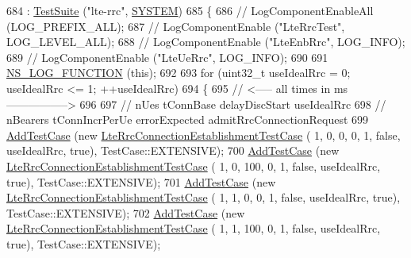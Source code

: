 \begin{DoxyCode}
684   : \hyperlink{classns3_1_1TestSuite_a904b0c40583b744d30908aeb94636d1a}{TestSuite} (\textcolor{stringliteral}{"lte-rrc"}, \hyperlink{classns3_1_1TestSuite_a1ebfcab34ec8161e085e8e3a1855eae0a90c5529a26ab3a5ffcc6e57040dbd82e}{SYSTEM})
685 \{
686 \textcolor{comment}{//  LogComponentEnableAll (LOG\_PREFIX\_ALL);}
687 \textcolor{comment}{//  LogComponentEnable ("LteRrcTest", LOG\_LEVEL\_ALL);}
688 \textcolor{comment}{//  LogComponentEnable ("LteEnbRrc", LOG\_INFO);}
689 \textcolor{comment}{//  LogComponentEnable ("LteUeRrc", LOG\_INFO);}
690 
691   \hyperlink{log-macros-disabled_8h_a90b90d5bad1f39cb1b64923ea94c0761}{NS\_LOG\_FUNCTION} (\textcolor{keyword}{this});
692 
693   \textcolor{keywordflow}{for} (uint32\_t useIdealRrc = 0; useIdealRrc <= 1; ++useIdealRrc)
694     \{
695       \textcolor{comment}{//         <----- all times in ms ----------------->}
696 
697       \textcolor{comment}{//                                                     nUes      tConnBase            delayDiscStart 
              useIdealRrc}
698       \textcolor{comment}{//                                                        nBearers       tConnIncrPerUe      
       errorExpected               admitRrcConnectionRequest}
699       \hyperlink{classns3_1_1TestCase_a3718088e3eefd5d6454569d2e0ddd835}{AddTestCase} (\textcolor{keyword}{new} \hyperlink{classLteRrcConnectionEstablishmentTestCase}{LteRrcConnectionEstablishmentTestCase}
       (  1,     0,      0,           0,           1, \textcolor{keyword}{false}, useIdealRrc, \textcolor{keyword}{true}), TestCase::EXTENSIVE);
700       \hyperlink{classns3_1_1TestCase_a3718088e3eefd5d6454569d2e0ddd835}{AddTestCase} (\textcolor{keyword}{new} \hyperlink{classLteRrcConnectionEstablishmentTestCase}{LteRrcConnectionEstablishmentTestCase}
       (  1,     0,    100,           0,           1, \textcolor{keyword}{false}, useIdealRrc, \textcolor{keyword}{true}), TestCase::EXTENSIVE);
701       \hyperlink{classns3_1_1TestCase_a3718088e3eefd5d6454569d2e0ddd835}{AddTestCase} (\textcolor{keyword}{new} \hyperlink{classLteRrcConnectionEstablishmentTestCase}{LteRrcConnectionEstablishmentTestCase}
       (  1,     1,      0,           0,           1, \textcolor{keyword}{false}, useIdealRrc, \textcolor{keyword}{true}), TestCase::EXTENSIVE);
702       \hyperlink{classns3_1_1TestCase_a3718088e3eefd5d6454569d2e0ddd835}{AddTestCase} (\textcolor{keyword}{new} \hyperlink{classLteRrcConnectionEstablishmentTestCase}{LteRrcConnectionEstablishmentTestCase}
       (  1,     1,    100,           0,           1, \textcolor{keyword}{false}, useIdealRrc, \textcolor{keyword}{true}), TestCase::EXTENSIVE);

\end{DoxyCode}
